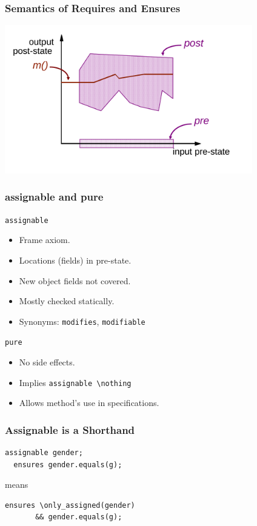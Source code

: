 \begin{frame}
\frametitle{Semantics of Requires and Ensures}
\includegraphics[width=4.25in]{correctimpl}
\end{frame}

\begin{frame}[fragile]
\frametitle{assignable and pure}

\lstinline!assignable!
\begin{itemize}
\item
Frame axiom.

\item
Locations (fields) in pre-state.

\item
New object fields not covered.

\item
Mostly checked statically.

\item
Synonyms: \lstinline!modifies!, \lstinline!modifiable!
\end{itemize}

\lstinline!pure!
\begin{itemize}
\item
No side effects.

\item
Implies \lstinline!assignable \nothing!

\item
Allows method's use in specifications.
\end{itemize}
\end{frame}

\begin{frame}[fragile]
\frametitle{Assignable is a Shorthand}
\begin{lstlisting}[mathescape=true]
  assignable gender;
  ensures gender.equals(g);
\end{lstlisting}

means

\begin{lstlisting}[mathescape=true]
  ensures \only_assigned(gender)
       && gender.equals(g);
\end{lstlisting}
\end{frame}


